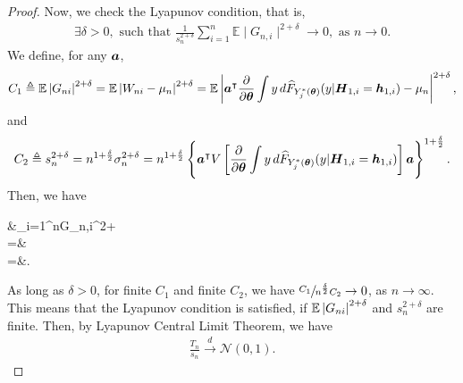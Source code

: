 \begin{proof}
	Now, we check the Lyapunov condition, that is, ~\cite{Lindsay1995,Hunter2014}
	\begin{gather*}
	\exists\delta>0, \text{ such that } \frac{1}{s_{n}^{2+\delta}}\sum_{i=1}^{n}\mathbb{E}\mid G_{n,i}\mid^{2+\delta}\to0, \text{ as } n\to0.
	\end{gather*}
	We define, for any $\boldsymbol{a}$,
	\begin{gather*}
	C_1 \triangleq \mathbb{E}\lt|G_{ni}\rt|^{2+\delta}=\mathbb{E}\lt|W_{ni}-\mu_{\ensuremath{n}}\rt|^{2+\delta}=\mathbb{E}\lt|\bs{a}^\itl \pard[\bs{\theta}]\int y \,d  \wh{F}_{Y_j^*(\bs{\theta})}(y | \bs{H}_{1,i} = \bs{h}_{1,i})-\mu_{n}\rt|^{2+\delta},
	\end{gather*}
	and
	\begin{gather*}
	C_2 \triangleq s_{n}^{2+\delta}=n^{1+\frac{\delta}{2}}\sigma_{n}^{2+\delta}=n^{1+\frac{\delta}{2}}\lt\{ \bs{a}^\itl  V \lt[ \pard[\bs{\theta}]\int y \,d  \wh{F}_{Y_j^*(\bs{\theta})}(y | \bs{H}_{1,i} = \bs{h}_{1,i}) \rt] \bs{a} \rt\} ^{1+\frac{\delta}{2}}.
	\end{gather*}
	Then, we have
	\begin{flalign*}
	&\sum_{i=1}^{n}\mid G_{n,i}\mid^{2+\delta}\\
	=& \\
	=&.
	\end{flalign*}
	
	As long as $\delta>0$, for finite $C_1$ and finite $C_2$, we have $\sfrac{C_{1}}{n^{\frac{\delta}{2}}C_{2}}\to0$,
	as $n\to\infty$. This means that the Lyapunov condition is satisfied, if $\mathbb{E}\left|G_{ni}\right|^{2+\delta}$ and $s_{n}^{2+\delta}$ are finite. Then,  by Lyapunov Central Limit Theorem, we have
	\begin{gather*}
	\frac{T_{n}}{s_{n}}\overset{d}{\to}\mathcal{N}(0,1).
	\end{gather*}
	

\end{proof}
